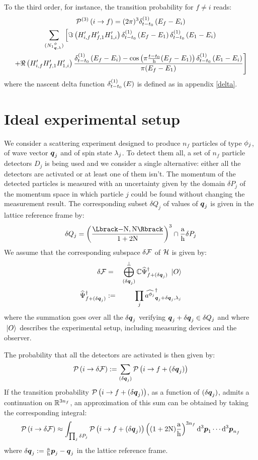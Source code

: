 \documentclass[10pt,a4paper,twoside,openany]{book}
\begin{document}
To the third order, for instance, the transition probability for $f \neq i$ reads:
\begin{multline*}
\TPn i f 3 = ( 2 \pi )^3 \deltaE1{E_f - E_i} \\
\sum_{\bFQ {N_1} \pt \q \sp} \left[ \Im \left( H'_{i,f} H'_{f,1} H'_{1,i} \right ) \deltaE1{E_f - E_1} \deltaE1{E_1 - E_i} \right. \\
\left. + \Re \left( H'_{i,f} H'_{f,1} H'_{1,i} \right ) \frac{\deltaE1{E_f - E_i} - \cos{\pi \frac{t - t_0} \h ( E_f - E_1 )} \deltaE1{E_1 - E_i}}{\pi ( E_f - E_1 )} \right]
\end{multline*}
where the nascent delta function $\deltaE1{E}$ is defined as in appendix \ref{delta}.

\section{Ideal experimental setup}

We consider a scattering experiment designed to produce $n_f$ particles of type $\pt_j$, of wave vector $\q_j$ and of spin state $\sp_j$. To detect them all, a set of $n_f$ particle detectors $D_j$ is being used and we consider a single alternative: either all the detectors are activated or at least one of them isn't. The momentum of the detected particles is measured with an uncertainty given by the domain $\delta P_j$ of the momentum space in which particle $j$ could be found without changing the measurement result. The corresponding subset $\delta Q_j$ of values of $\q_j$ is given in the lattice reference frame by:
\begin{equation*}
\delta Q_j = \FLD \cap \frac \a \h \delta P_j
\end{equation*}
We assume that the corresponding subspace $\delta \F$ of $\H$ is given by:
\begin{eqnarray*}
\delta \F & = & \bigoplus_{(\delta \q_j)}^{\perp} \IC \dop{\Psi}_{f + (\delta \q_j)} \ket{O} \\
\dop{\Psi}_{f + (\delta \q_j)} & \eqdef & \prod_j \cop {\pt_j} {\q_j + \delta \q_j} {\sp_j}
\end{eqnarray*}
where the summation goes over all the $\delta \q_j$ verifying $\q_j + \delta \q_j \in \delta Q_j$ and where $\ket{O}$ describes the experimental setup, including measuring devices and the observer.

The probability that all the detectors are activated is then given by:
\begin{equation*}
\TP i {\delta \F} \eqdef \sum_{(\delta \q_j)} \TP i {f + (\delta \q_j)}
\end{equation*}
If the transition probability $\TP i {f + (\delta \q_j)}$, as a function of $(\delta \q_j)$, admits a continuation on $\IR^{3 n_f}$, an approximation of this sum can be obtained by taking the corresponding integral:
\begin{equation*}
\TP i {\delta \F} \approx \int_{\prod_j \delta P_j} \TP i {f + (\delta \q_j)} \left( (1 + 2 \N) \frac \a \h \right)^{3 n_f} \dtp_1 \dotsm \dtp_{n_f}
\end{equation*}
where $\delta \q_j \eqdef \frac \a \h \p_j - \q_j$ in the lattice reference frame.
\end{document}
